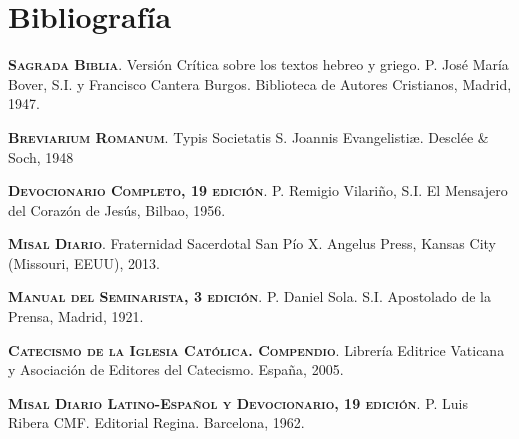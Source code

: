 \documentclass[10pt,twoside]{book}
\begin{document}

\chapter*{Bibliografía}

\setlength{\parindent}{0ex}
\textsc{\textbf{Sagrada Biblia}}. Versión Crítica sobre los textos hebreo y griego. P. José María Bover, S.I. y Francisco Cantera Burgos. Biblioteca de Autores Cristianos, Madrid, 1947.

\textsc{\textbf{Breviarium Romanum}}. Typis Societatis S. Joannis Evangelisti\ae. Desclée \& Soch, 1948

\textsc{\textbf{Devocionario Completo, 19 edición}}. P. Remigio Vilariño, S.I. El Mensajero del Corazón de Jesús, Bilbao, 1956.

\textsc{\textbf{Misal Diario}}. Fraternidad Sacerdotal San Pío X. Angelus Press, Kansas City (Missouri, EEUU), 2013.

\textsc{\textbf{Manual del Seminarista, 3 edición}}. P. Daniel Sola. S.I. Apostolado de la Prensa, Madrid, 1921.

\textsc{\textbf{Catecismo de la Iglesia Católica. Compendio}}. Librería Editrice Vaticana y Asociación de Editores del Catecismo. España, 2005.

\textsc{\textbf{Misal Diario Latino-Español y Devocionario, 19 edición}}. P. Luis Ribera CMF. Editorial Regina. Barcelona, 1962.
\end{document}
